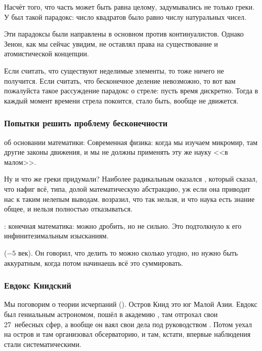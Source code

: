 \documentclass[a4paper,oneside,fleqn,10pt]{article}
\begin{document}
Насчёт того, что часть может быть равна целому, задумывались не только
греки. У  был такой парадокс: число квадратов
было равно числу натуральных чисел.

Эти парадоксы были направлены в основном против континуалистов. Однако
Зенон, как мы сейчас увидим, не оставлял права на существование и
атомистической концепции.

Если считать, что существуют неделимые элементы, то тоже ничего не
получится. Если считать, что бесконечное деление невозможно, то вот
вам пожалуйста такое рассуждение парадокс о стреле: пусть время
дискретно. Тогда в каждый момент времени стрела покоится, стало быть,
вообще не движется.

\subsubsection{Попытки решить проблему бесконечности}

 об основании математики:
Современная физика: когда мы изучаем микромир, там другие законы
движения, и мы не должны применять эту же науку <<в малом>>.

Ну и что же греки придумали?  Наиболее радикальным оказался
, который сказал, что нафиг всё, типа, долой
математическую абстракцию, уж если она приводит нас к таким нелепым
выводам.   возразил, что так нельзя, и что наука есть
знание общее, и нельзя полностью отказываться.

: конечная математика: можно дробить, но не сильно. Это
подтолкнуло  к его инфинитезимальным
изысканиям.

 ($-5$ век). Он говорил, что делить то можно сколько
угодно, но нужно быть аккуратным, когда потом начинаешь всё это
суммировать.

\subsubsection{Евдокс Книдский}

Мы поговорим о теории исчерпаний  ().  Остров Книд это юг Малой Азии.  Евдокс
был гениальным астрономом, пошёл в академию ,
там отгрохал свои 27~небесных сфер, а вообще он ваял свои дела под
руководством .  Потом
уехал на остров и там организовал обсерваторию, и там, кстати, впервые
наблюдения стали систематическими.
\end{document}
